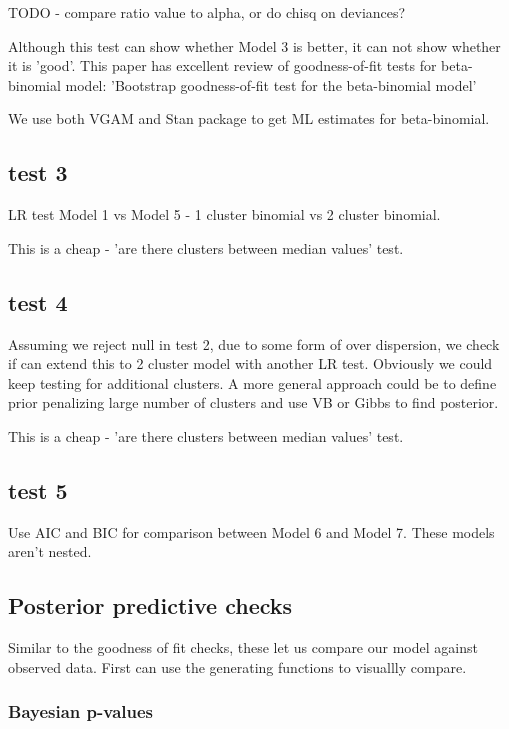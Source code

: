 \documentclass[12pt]{article}
\begin{document}
TODO - compare ratio value to alpha, or do chisq on deviances?

Although this test can show whether Model 3 is better, it can not show whether it is 'good'. This paper has excellent review of goodness-of-fit tests for beta-binomial model:
'Bootstrap goodness-of-fit test for the beta-binomial model'

We use both VGAM and Stan package to get ML estimates for beta-binomial.

\subsection{test 3}

LR test Model 1 vs Model 5 - 1 cluster binomial vs 2 cluster binomial. 

This is a cheap - 'are there clusters between median values' test. 

\subsection{test 4}

Assuming we reject null in test 2, due to some form of over dispersion, we check if can extend this to 2 cluster model with another LR test. Obviously we could keep testing for additional clusters. A more general approach could be to define prior penalizing large number of clusters and use VB or Gibbs to find posterior.

This is a cheap - 'are there clusters between median values' test. 


\subsection{test 5}

Use AIC and BIC for comparison between Model 6 and Model 7. These models aren't nested.

\subsection{Posterior predictive checks}

Similar to the goodness of fit checks, these let us compare our model against observed data. First can use the generating functions to visuallly compare.

\subsubsection{Bayesian p-values}
\end{document}
